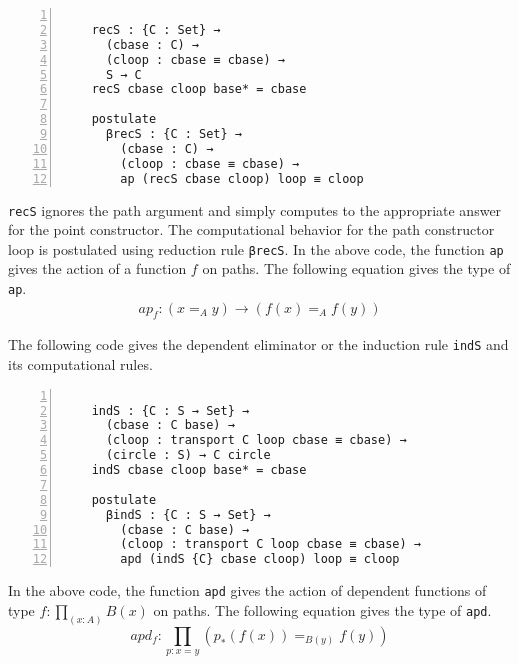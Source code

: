 \documentclass[sigplan,10pt]{acmart}
\begin{document}
\begin{center}
\begingroup
\fontsize{7pt}{9pt}\selectfont
\begin{Verbatim}[frame = lines, rulecolor=\color{blue}, numbers = left, numbersep = 0pt]

    recS : {C : Set} → 
      (cbase : C) → 
      (cloop : cbase ≡ cbase) → 
      S → C
    recS cbase cloop base* = cbase

    postulate
      βrecS : {C : Set} → 
        (cbase : C) → 
        (cloop : cbase ≡ cbase) → 
        ap (recS cbase cloop) loop ≡ cloop

\end{Verbatim}
\endgroup
\end{center}

\normalsize
 
{\tt recS} ignores the path argument and simply computes to the appropriate answer for the point constructor. The computational behavior for the path constructor loop is postulated using reduction rule {\tt βrecS}. In the above code, the function {\tt ap} gives the action of a function $f$ on paths. The following equation gives the type of {\tt ap}. 
\begin{align} \label{eq:ap}
ap_f : (x =_A y) \rightarrow (f(x) =_A f(y))
\end{align}

The following code gives the dependent eliminator or the induction rule {\tt indS} and its computational rules.
 
\begin{center}
\begingroup
\fontsize{7pt}{9pt}\selectfont
\begin{Verbatim}[frame = lines, rulecolor=\color{blue}, numbers = left, numbersep = 0pt]
 
    indS : {C : S → Set} → 
      (cbase : C base) → 
      (cloop : transport C loop cbase ≡ cbase) → 
      (circle : S) → C circle
    indS cbase cloop base* = cbase

    postulate
      βindS : {C : S → Set} → 
        (cbase : C base) →
        (cloop : transport C loop cbase ≡ cbase) → 
        apd (indS {C} cbase cloop) loop ≡ cloop

\end{Verbatim}
\endgroup
\end{center}

\normalsize
In the above code, the function {\tt apd} gives the action of dependent functions of type $f : \prod_{(x:A)}B(x)$ on paths. The following equation gives the type of {\tt apd}.
\begin{equation} \label{eq:apd}
	apd_f : \prod_{p:x=y} (p_*(f(x)) =_{B(y)} f(y))
\end{equation}
 
\end{document}
